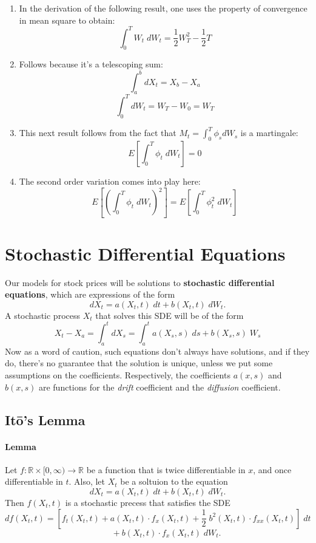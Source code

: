 \documentclass[a4paper,12pt]{scrartcl}
\begin{document}
\begin{enumerate} 
   \item{In the derivation of the following result, 
      one uses the property of 
      convergence in mean square to obtain:
      \[ \int_0^T W_t \; dW_t = \frac{1}{2} W_T^2 - \frac{1}{2} T \]}
   \item{Follows because it's a telescoping sum:
      \[ \int_a^b dX_t = X_b - X_a  \]
      \[ \int_0^T dW_t = W_T - W_0 = W_T \]}
   \item{This next result follows from the fact that $M_t = \int_0^T
      \phi_s dW_s$ is a martingale:
      \[ E\left[\int_0^T \phi_t \; dW_t\right] = 0 \]}
   \item{The second order variation comes into play here: 
      \[ E\left[\left(\int_0^T \phi_t \; dW_t\right)^2\right] = 
      E\left[\int_0^T \phi^2_t \; dW_t\right] \]}
\end{enumerate}
   



\section{Stochastic Differential Equations}

Our models for stock prices will be solutions to \textbf{stochastic
differential equations}, which are expressions of the form
\begin{equation}
   \label{sde}
   dX_t = a(X_t,t)\;dt + b(X_t,t)\;dW_t. 
\end{equation}
A stochastic process $X_t$ that solves this SDE will be of the form 
   \[ X_t - X_a = \int_a^t dX_s = \int_a^t a(X_s,s)\;ds + b(X_s,s)\;W_s
      \]
Now as a word of caution, such equations don't always have solutions, and
if they do, there's no guarantee that the solution is unique, unless
we put some assumptions on the coefficients.  Respectively, the 
coefficients $a(x,s)$ and $b(x,s)$ are functions for the \emph{drift}
coefficient and the \emph{diffusion} coefficient.

\subsection{It\={o}'s Lemma}

\paragraph{Lemma} Let $f: \mathbb{R}\times [0,\infty) \rightarrow 
\mathbb{R}$ be a function that is twice differentiable in $x$, and
once differentiable in $t$. Also, let $X_t$ be a soltuion to the equation
   \[ dX_t = a(X_t,t)\; dt + b(X_t,t)\; dW_t.\]
Then $f(X_t,t)$ is a stochastic precess that satisfies the SDE
   \[ df(X_t,t) = \left[f_t(X_t,t) + a(X_t,t) \cdot f_x(X_t,t)
      + \frac{1}{2}\; b^2(X_t,t)\cdot f_{xx}(X_t,t)\right]\;dt \]
   \[ \qquad + b(X_t,t)\cdot f_x(X_t,t)\;dW_t. \]
\end{document}
